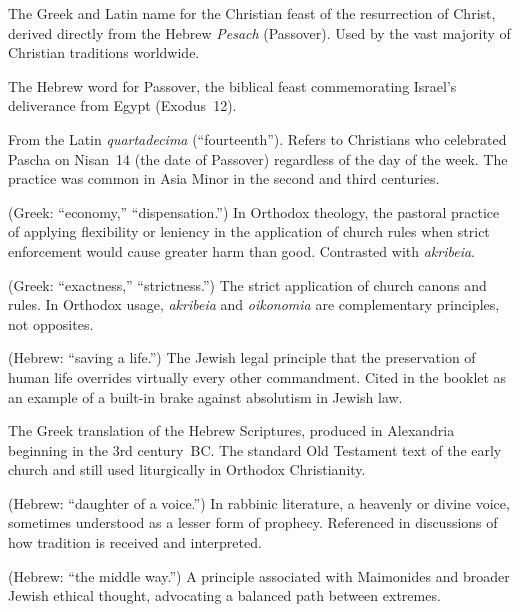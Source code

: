 \documentclass[10pt,twoside,openany]{book}
\newcommand{\texthebrew}[1]{{\hebrewfont #1}}
\newcommand{\textgreek}[1]{{\greekfont #1}}
\begin{document}
\begin{description}[style=nextline, leftmargin=1.5em, labelindent=0em]

\item[\emph{Pascha} (\textgreek{Πάσχα})]
The Greek and Latin name for the Christian feast of the resurrection
of Christ, derived directly from the Hebrew \emph{Pesach} (Passover).
Used by the vast majority of Christian traditions worldwide.

\item[\emph{Pesach} (\texthebrew{פֶּסַח})]
The Hebrew word for Passover, the biblical feast commemorating
Israel's deliverance from Egypt (Exodus~12).

\item[\emph{Quartodeciman}]
From the Latin \emph{quartadecima} (``fourteenth''). Refers to
Christians who celebrated Pascha on Nisan~14 (the date of Passover)
regardless of the day of the week. The practice was common in Asia
Minor in the second and third centuries.

\item[\emph{Oikonomia} (\textgreek{οἰκονομία})]
(Greek: ``economy,'' ``dispensation.'') In Orthodox theology, the
pastoral practice of applying flexibility or leniency in the
application of church rules when strict enforcement would cause
greater harm than good. Contrasted with \emph{akribeia}.

\item[\emph{Akribeia} (\textgreek{ἀκρίβεια})]
(Greek: ``exactness,'' ``strictness.'') The strict application of
church canons and rules. In Orthodox usage, \emph{akribeia} and
\emph{oikonomia} are complementary principles, not opposites.

\item[\emph{Pikuach nefesh} (\texthebrew{פִּקּוּחַ נֶפֶשׁ})]
(Hebrew: ``saving a life.'') The Jewish legal principle that the
preservation of human life overrides virtually every other
commandment. Cited in the booklet as an example of a built-in brake
against absolutism in Jewish law.

\item[\emph{Septuagint} (\textgreek{ἡ μετάφρασις τῶν ἑβδομήκοντα})]
The Greek translation of the Hebrew Scriptures, produced in
Alexandria beginning in the 3rd century~BC. The standard Old Testament
text of the early church and still used liturgically in Orthodox
Christianity.

\item[\emph{Bat kol} (\texthebrew{בַּת קוֹל})]
(Hebrew: ``daughter of a voice.'') In rabbinic literature, a heavenly
or divine voice, sometimes understood as a lesser form of prophecy.
Referenced in discussions of how tradition is received and interpreted.

\item[\emph{Derekh ha-emtza'it} (\texthebrew{דֶּרֶךְ הָאֶמְצָעִית})]
(Hebrew: ``the middle way.'') A principle associated with Maimonides
and broader Jewish ethical thought, advocating a balanced path between
extremes.

\end{description}
\end{document}
